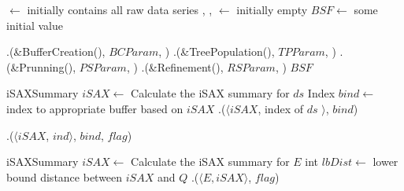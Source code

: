 \begin{algorithm}[htbp]
    \footnotesize
    \vspace*{2mm}
    
    \begin{algorithmic}[1]
    
        \State \BC $\gets$ initially contains all raw data series
        \State \TP, \PS, \RS $\gets$ initially empty
        \State $\mathit{BSF} \gets$ some initial value
    \EndProcedure
    
    \vspace*{1mm}
    \vspace*{1mm}


        \State \BC.\Traverse(\&BufferCreation(), $\mathit{BCParam}$, \False)
        \State \TP.\Traverse(\&TreePopulation(), $\mathit{TPParam}$, \False)
        \State \PS.\Traverse(\&Prunning(), $\mathit{PSParam}$, \False)
        \State \RS.\Traverse(\&Refinement(), $\mathit{RSParam}$, \True)
        \State \Return $\mathit{BSF}$
    \EndProcedure
    
    \vspace*{1mm}
        \State iSAXSummary $\mathit{iSAX} \gets$ Calculate the iSAX summary for $\mathit{ds}$
        \State Index $\mathit{bind} \gets$ index to appropriate buffer based on $\mathit{iSAX}$
        \State \TP.\Put($\langle \mathit{iSAX}$, index of $\mathit{ds}$ $\rangle$, $\mathit{bind}$)
    \EndProcedure
    
    \vspace*{1mm}
        \State \PS.\Put($\langle \mathit{iSAX}$, $\mathit{ind} \rangle$, $\mathit{bind}$, $\mathit{flag}$)
    \EndProcedure
    
    \vspace*{1mm}
            \State iSAXSummary $\mathit{iSAX} \gets$ Calculate the iSAX summary for $\mathit{E}$
            \State int $\mathit{lbDist} \gets$ lower bound distance between $\mathit{iSAX}$ and $Q$
                \State \RS.\Put($\langle \mathit{E, iSAX} \rangle$, $\mathit{flag}$)
                \Return \True
            \EndIf
            \Return \False
    \EndProcedure
    

\end{algorithmic}
\end{algorithm}
